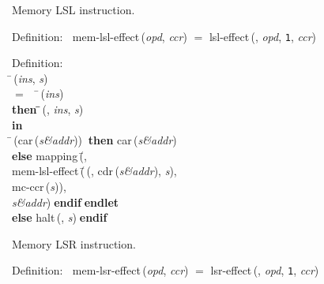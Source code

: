  Memory LSL instruction.
\begin{tabbing}{\sc Definition}:$\;\;$
{\rm{mem-lsl-effect}}\,({\it{opd\/}}, {\it{ccr\/}}) $=$ {\rm{lsl-effect}}\,({}, {\it{opd\/}}, {\tt{1}}, {\it{ccr\/}})
\end{tabbing}

\begin{tabbing}{\sc Definition}: \\  
\=\,({\it{ins\/}}, {\it{s\/}}) \\ 
$=$$\;\;\;\;$\=\,({\it{ins\/}}) \\ 
{\bf then }\=\=\,({}, {\it{ins\/}}, {\it{s\/}})\- \\ 
{\bf in} \\ 
\=\,({\rm{car}}\,({\it{s\&addr\/}}))$\;\;${\bf then }{\rm{car}}\,({\it{s\&addr\/}}) \\ 
{\bf else }{\rm{mapping}}\,(\=, \\ 
{\rm{mem-lsl-effect}}\,(\=\,({}, {\rm{cdr}}\,({\it{s\&addr\/}}), {\it{s\/}}), \\ 
{\rm{mc-ccr}}\,({\it{s\/}}))\-, \\ 
{\it{s\&addr\/}})\-$\;${\bf  endif}\-$\;${\bf  endlet}\- \\ 
{\bf else }{\rm{halt}}\,({}, {\it{s\/}})$\;${\bf  endif}\-\-
\end{tabbing}

 Memory LSR instruction.
\begin{tabbing}{\sc Definition}:$\;\;$
{\rm{mem-lsr-effect}}\,({\it{opd\/}}, {\it{ccr\/}}) $=$ {\rm{lsr-effect}}\,({}, {\it{opd\/}}, {\tt{1}}, {\it{ccr\/}})
\end{tabbing}

